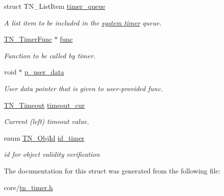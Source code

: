 \begin{DoxyCompactItemize}
\item 
\hypertarget{structTN__Timer_a9418f1d84fa83d87197f3457ddb74e27}{struct T\+N\+\_\+\+List\+Item \hyperlink{structTN__Timer_a9418f1d84fa83d87197f3457ddb74e27}{timer\+\_\+queue}}\label{structTN__Timer_a9418f1d84fa83d87197f3457ddb74e27}

\begin{DoxyCompactList}\small\item\em A list item to be included in the {\itshape \hyperlink{quick_guide_time_ticks}{system timer}} queue. \end{DoxyCompactList}\item 
\hypertarget{structTN__Timer_a154ff9bb98135481b1874bdd8d6f2b9c}{\hyperlink{tn__timer_8h_a98be38210cd5a636dc4170e087ea0e67}{T\+N\+\_\+\+Timer\+Func} $\ast$ \hyperlink{structTN__Timer_a154ff9bb98135481b1874bdd8d6f2b9c}{func}}\label{structTN__Timer_a154ff9bb98135481b1874bdd8d6f2b9c}

\begin{DoxyCompactList}\small\item\em Function to be called by timer. \end{DoxyCompactList}\item 
\hypertarget{structTN__Timer_aaf753d5fb1001702f07379b2ed7ac177}{void $\ast$ \hyperlink{structTN__Timer_aaf753d5fb1001702f07379b2ed7ac177}{p\+\_\+user\+\_\+data}}\label{structTN__Timer_aaf753d5fb1001702f07379b2ed7ac177}

\begin{DoxyCompactList}\small\item\em User data pointer that is given to user-\/provided {\ttfamily func}. \end{DoxyCompactList}\item 
\hypertarget{structTN__Timer_a189fd9a922651e0cdfa442f05ff4423f}{\hyperlink{tn__common_8h_a34c07c1fa20ae71d17817d28a41957fe}{T\+N\+\_\+\+Timeout} \hyperlink{structTN__Timer_a189fd9a922651e0cdfa442f05ff4423f}{timeout\+\_\+cur}}\label{structTN__Timer_a189fd9a922651e0cdfa442f05ff4423f}

\begin{DoxyCompactList}\small\item\em Current (left) timeout value. \end{DoxyCompactList}\item 
\hypertarget{structTN__Timer_a27482d3470455064da95b9453ae87156}{enum \hyperlink{tn__common_8h_ae779dd1f6735f6e139fb70acd004d976}{T\+N\+\_\+\+Obj\+Id} \hyperlink{structTN__Timer_a27482d3470455064da95b9453ae87156}{id\+\_\+timer}}\label{structTN__Timer_a27482d3470455064da95b9453ae87156}

\begin{DoxyCompactList}\small\item\em id for object validity verification \end{DoxyCompactList}\end{DoxyCompactItemize}


The documentation for this struct was generated from the following file\+:\begin{DoxyCompactItemize}
\item 
core/\hyperlink{tn__timer_8h}{tn\+\_\+timer.\+h}\end{DoxyCompactItemize}
